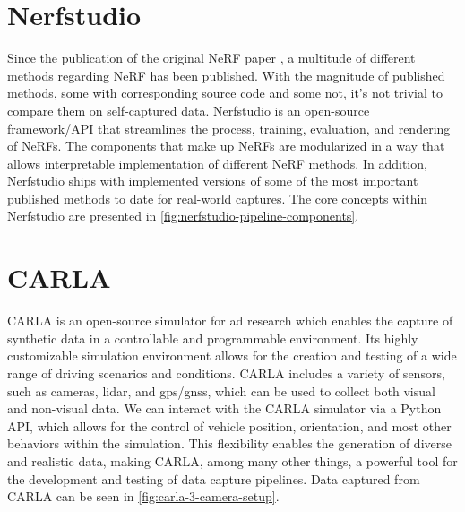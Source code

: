 \section{Nerfstudio} \label{sec:nerfstudio}

Since the publication of the original NeRF paper \cite{mildenhall_nerf_2020}, a multitude of different methods regarding NeRF has been published. With the magnitude of published methods, some with corresponding source code and some not, it's not trivial to compare them on self-captured data. Nerfstudio \cite{nerfstudio} is an open-source framework/API that streamlines the process, training, evaluation, and rendering of NeRFs. The components that make up NeRFs are modularized in a way that allows interpretable implementation of different NeRF methods. In addition, Nerfstudio ships with implemented versions of some of the most important published methods to date for real-world captures. The core concepts within Nerfstudio are presented in \autoref{fig:nerfstudio-pipeline-components}. 






\section{CARLA} \label{sec:carla}
CARLA \cite{Dosovitskiy17} is an open-source simulator for \acrshort{ad} research which enables the capture of synthetic data in a controllable and programmable environment. Its highly customizable simulation environment allows for the creation and testing of a wide range of driving scenarios and conditions. CARLA includes a variety of sensors, such as cameras, \acrfull{lidar}, and \acrfull{gps}/\acrfull{gnss}, which can be used to collect both visual and non-visual data. We can interact with the CARLA simulator via a Python API, which allows for the control of vehicle position, orientation, and most other behaviors within the simulation. This flexibility enables the generation of diverse and realistic data, making CARLA, among many other things, a powerful tool for the development and testing of data capture pipelines. Data captured from CARLA can be seen in \autoref{fig:carla-3-camera-setup}.

